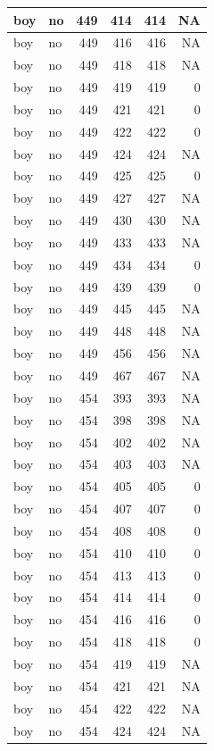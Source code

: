 \documentclass[man]{apa6}
\begin{document}
\begin{tabular}{l|l|r|r|r|r}
\hline
boy & no & 449 & 414 & 414 & NA\\
\hline
boy & no & 449 & 416 & 416 & NA\\
\hline
boy & no & 449 & 418 & 418 & NA\\
\hline
boy & no & 449 & 419 & 419 & 0\\
\hline
boy & no & 449 & 421 & 421 & 0\\
\hline
boy & no & 449 & 422 & 422 & 0\\
\hline
boy & no & 449 & 424 & 424 & NA\\
\hline
boy & no & 449 & 425 & 425 & 0\\
\hline
boy & no & 449 & 427 & 427 & NA\\
\hline
boy & no & 449 & 430 & 430 & NA\\
\hline
boy & no & 449 & 433 & 433 & NA\\
\hline
boy & no & 449 & 434 & 434 & 0\\
\hline
boy & no & 449 & 439 & 439 & 0\\
\hline
boy & no & 449 & 445 & 445 & NA\\
\hline
boy & no & 449 & 448 & 448 & NA\\
\hline
boy & no & 449 & 456 & 456 & NA\\
\hline
boy & no & 449 & 467 & 467 & NA\\
\hline
boy & no & 454 & 393 & 393 & NA\\
\hline
boy & no & 454 & 398 & 398 & NA\\
\hline
boy & no & 454 & 402 & 402 & NA\\
\hline
boy & no & 454 & 403 & 403 & NA\\
\hline
boy & no & 454 & 405 & 405 & 0\\
\hline
boy & no & 454 & 407 & 407 & 0\\
\hline
boy & no & 454 & 408 & 408 & 0\\
\hline
boy & no & 454 & 410 & 410 & 0\\
\hline
boy & no & 454 & 413 & 413 & 0\\
\hline
boy & no & 454 & 414 & 414 & 0\\
\hline
boy & no & 454 & 416 & 416 & 0\\
\hline
boy & no & 454 & 418 & 418 & 0\\
\hline
boy & no & 454 & 419 & 419 & NA\\
\hline
boy & no & 454 & 421 & 421 & NA\\
\hline
boy & no & 454 & 422 & 422 & NA\\
\hline
boy & no & 454 & 424 & 424 & NA\\

\end{tabular}
\end{document}
